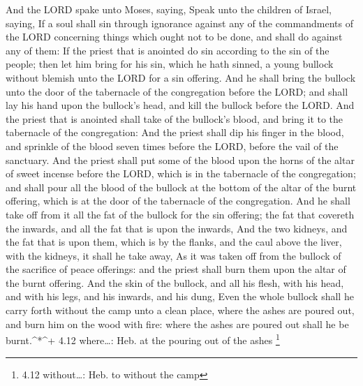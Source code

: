  And the LORD spake unto Moses, saying,  Speak
unto the children of Israel, saying, If a soul shall sin through
ignorance against any of the commandments of the LORD concerning things
which ought not to be done, and shall do against any of them:
 If the priest that is anointed do sin according to the sin
of the people; then let him bring for his sin, which he hath sinned, a
young bullock without blemish unto the LORD for a sin offering.
 And he shall bring the bullock unto the door of the
tabernacle of the congregation before the LORD; and shall lay his hand
upon the bullock's head, and kill the bullock before the LORD.
 And the priest that is anointed shall take of the bullock's
blood, and bring it to the tabernacle of the congregation: 
And the priest shall dip his finger in the blood, and sprinkle of the
blood seven times before the LORD, before the vail of the sanctuary.
 And the priest shall put some of the blood upon the horns
of the altar of sweet incense before the LORD, which is in the
tabernacle of the congregation; and shall pour all the blood of the
bullock at the bottom of the altar of the burnt offering, which is at
the door of the tabernacle of the congregation.  And he
shall take off from it all the fat of the bullock for the sin offering;
the fat that covereth the inwards, and all the fat that is upon the
inwards,  And the two kidneys, and the fat that is upon
them, which is by the flanks, and the caul above the liver, with the
kidneys, it shall he take away,  As it was taken off from
the bullock of the sacrifice of peace offerings: and the priest shall
burn them upon the altar of the burnt offering.  And the
skin of the bullock, and all his flesh, with his head, and with his
legs, and his inwards, and his dung,  Even the whole
bullock shall he carry forth without the camp unto a clean place, where
the ashes are poured out, and burn him on the wood with fire: where the
ashes are poured out shall he be burnt.\^{}*\^{}+ 4.12 where\ldots: Heb.
at the pouring out of the ashes \footnote{4.12 without\ldots: Heb. to
  without the camp}

